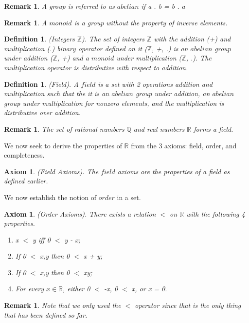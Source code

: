 \documentclass[twoside]{article}
\newtheorem{axiom}[theorem]{Axiom}
\newtheorem{remark}[theorem]{Remark}
\newtheorem{definition}[theorem]{Definition}
\begin{document}
\begin{remark}
A group is referred to as $\textit{abelian}$ if a . b = b . a 
\end{remark}

\begin{remark}
A $\textit{monoid}$ is a group without the property of inverse elements.
\end{remark}

\begin{definition}
(Integers $\mathbb{Z}$). The set of integers $\mathbb{Z}$ with the addition (+) and multiplication (.) binary operator defined on it ($\mathbb{Z}$, +, .) is an $\mathit{abelian}$ group under addition ($\mathbb{Z}$, +) and a $\mathit{monoid}$ under multiplication ($\mathbb{Z}$, .). The multiplication operator is distributive with respect to addition.
\end{definition}

\begin{definition}
(Field). A $\textit{field}$ is a set with 2 operations addition and multiplication such that the it is an $\textit{abelian}$ group under addition, an $\textit{abelian}$ group under multiplication for nonzero elements, and the multiplication is distributive over addition.
\end{definition}

\begin{remark}
The set of rational numbers $\mathbb{Q}$ and real numbers $\mathbb{R}$ forms a field.
\end{remark}

We now seek to derive the properties of $\mathbb{R}$ from the 3 axioms: field, order, and completeness.

\begin{axiom}
(Field Axioms). The $\textit{field}$ axioms are the properties of a field as defined earlier.
\end{axiom}

We now establish the notion of $\textit{order}$ in a set.
\begin{axiom}
(Order Axioms). There exists a relation $<$ on $\mathbb{R}$ with the following 4 properties.
\begin{enumerate}
  \item x $<$ y iff 0 $<$ y - x;
  \item If 0 $<$ x,y then 0 $<$ x + y;
  \item If 0 $<$ x,y then 0 $<$ xy;
  \item For every $x \in \mathbb{R}$, either 0 $<$ -x,  0 $<$ x, or x = 0.
\end{enumerate}
\end{axiom}
\begin{remark}
Note that we only used the $<$ operator since that is the only thing that has been defined so far.
\end{remark}
\end{document}
